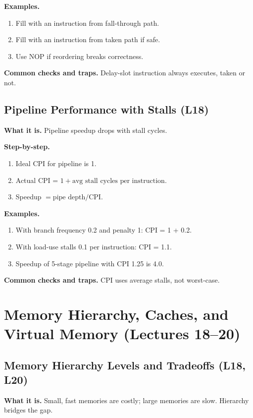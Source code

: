 \documentclass[11pt]{article}
\begin{document}
\textbf{Examples.}
\begin{enumerate}[leftmargin=*]
  \item Fill with an instruction from fall-through path.
  \item Fill with an instruction from taken path if safe.
  \item Use NOP if reordering breaks correctness.
\end{enumerate}

\textbf{Common checks and traps.} Delay-slot instruction always executes, taken or not.

\subsection{Pipeline Performance with Stalls (L18)}
\textbf{What it is.} Pipeline speedup drops with stall cycles.

\textbf{Step-by-step.}
\begin{enumerate}[leftmargin=*]
  \item Ideal CPI for pipeline is 1.
  \item Actual CPI = $1 + \text{avg stall cycles per instruction}$.
  \item Speedup $= \text{pipe depth} / \text{CPI}$.
\end{enumerate}

\textbf{Examples.}
\begin{enumerate}[leftmargin=*]
  \item With branch frequency 0.2 and penalty 1: CPI = 1 + 0.2.
  \item With load-use stalls 0.1 per instruction: CPI = 1.1.
  \item Speedup of 5-stage pipeline with CPI 1.25 is 4.0.
\end{enumerate}

\textbf{Common checks and traps.} CPI uses average stalls, not worst-case.

\section{Memory Hierarchy, Caches, and Virtual Memory (Lectures 18--20)}

\subsection{Memory Hierarchy Levels and Tradeoffs (L18, L20)}
\textbf{What it is.} Small, fast memories are costly; large memories are slow. Hierarchy bridges the gap.
\end{document}
